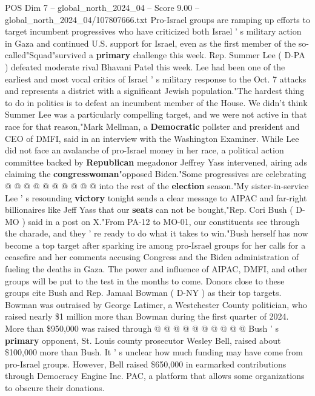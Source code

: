 \begin{textsample}{POS Dim 7 – global\_north\_2024\_04 – Score 9.00 – global\_north\_2024\_04/107807666.txt}  \label{ex:f7_pos_070}
Pro-Israel groups are ramping up efforts to target incumbent progressives who have criticized both Israel ' s military action in Gaza and continued U.S. support for Israel, even as the first member of the so-called"Squad"survived a \textbf{primary} challenge this week.
Rep.
Summer Lee ( D-PA ) defeated moderate rival Bhavani Patel this week.
Lee had been one of the earliest and most vocal critics of Israel ' s military response to the Oct. 7 attacks and represents a district with a significant Jewish population."The hardest thing to do in politics is to defeat an incumbent member of the House.
We didn't think Summer Lee was a particularly compelling target, and we were not active in that race for that reason,"Mark Mellman, a \textbf{Democratic} pollster and president and CEO of DMFI, said in an interview with the Washington Examiner.
While Lee did not face an avalanche of pro-Israel money in her race, a political action committee backed by \textbf{Republican} megadonor Jeffrey Yass intervened, airing ads claiming the \textbf{congresswoman}"opposed Biden."Some progressives are celebrating @ @ @ @ @ @ @ @ @ @ into the rest of the \textbf{election} season."My sister-in-service Lee ' s resounding \textbf{victory} tonight sends a clear message to AIPAC and far-right billionaires like Jeff Yass that our \textbf{seats} can not be bought,"Rep.
Cori Bush ( D-MO ) said in a post on X."From PA-12 to MO-01, our constituents see through the charade, and they ' re ready to do what it takes to win."Bush herself has now become a top target after sparking ire among pro-Israel groups for her calls for a ceasefire and her comments accusing Congress and the Biden administration of fueling the deaths in Gaza.
The power and influence of AIPAC, DMFI, and other groups will be put to the test in the months to come.
Donors close to these groups cite Bush and Rep.
Jamaal Bowman ( D-NY ) as their top targets.
Bowman was outraised by George Latimer, a Westchester County politician, who raised nearly \$1 million more than Bowman during the first quarter of 2024.
More than \$950,000 was raised through @ @ @ @ @ @ @ @ @ @ Bush ' s \textbf{primary} opponent, St.
Louis county prosecutor Wesley Bell, raised about \$100,000 more than Bush.
It ' s unclear how much funding may have come from pro-Israel groups.
However, Bell raised \$650,000 in earmarked contributions through Democracy Engine Inc.
PAC, a platform that allows some organizations to obscure their donations.

\end{textsample}
